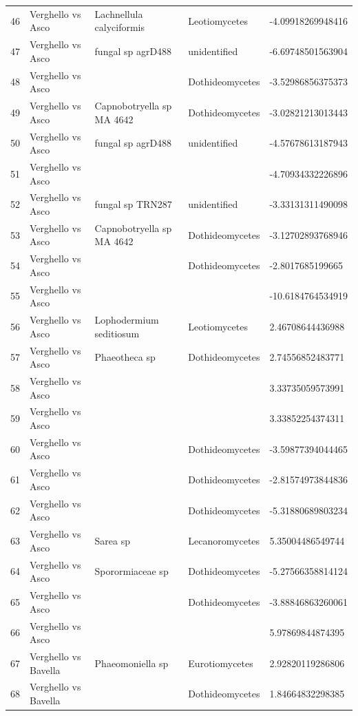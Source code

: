 \documentclass[12pt]{article}\usepackage[]{graphicx}\usepackage[]{color}
\numberwithin{figure}{section}
\begin{document}
\begin{table}[ht]
\begin{tabular}{lllll}
  46 & Verghello vs Asco & Lachnellula calyciformis & Leotiomycetes & -4.09918269948416 \\ 
  47 & Verghello vs Asco & fungal sp agrD488 & unidentified & -6.69748501563904 \\ 
  48 & Verghello vs Asco &  & Dothideomycetes & -3.52986856375373 \\ 
  49 & Verghello vs Asco & Capnobotryella sp MA 4642 & Dothideomycetes & -3.02821213013443 \\ 
  50 & Verghello vs Asco & fungal sp agrD488 & unidentified & -4.57678613187943 \\ 
  51 & Verghello vs Asco &  &  & -4.70934332226896 \\ 
  52 & Verghello vs Asco & fungal sp TRN287 & unidentified & -3.33131311490098 \\ 
  53 & Verghello vs Asco & Capnobotryella sp MA 4642 & Dothideomycetes & -3.12702893768946 \\ 
  54 & Verghello vs Asco &  & Dothideomycetes & -2.8017685199665 \\ 
  55 & Verghello vs Asco &  &  & -10.6184764534919 \\ 
  56 & Verghello vs Asco & Lophodermium seditiosum & Leotiomycetes & 2.46708644436988 \\ 
  57 & Verghello vs Asco & Phaeotheca sp & Dothideomycetes & 2.74556852483771 \\ 
  58 & Verghello vs Asco &  &  & 3.33735059573991 \\ 
  59 & Verghello vs Asco &  &  & 3.33852254374311 \\ 
  60 & Verghello vs Asco &  & Dothideomycetes & -3.59877394044465 \\ 
  61 & Verghello vs Asco &  & Dothideomycetes & -2.81574973844836 \\ 
  62 & Verghello vs Asco &  & Dothideomycetes & -5.31880689803234 \\ 
  63 & Verghello vs Asco & Sarea sp & Lecanoromycetes & 5.35004486549744 \\ 
  64 & Verghello vs Asco & Sporormiaceae sp & Dothideomycetes & -5.27566358814124 \\ 
  65 & Verghello vs Asco &  & Dothideomycetes & -3.88846863260061 \\ 
  66 & Verghello vs Asco &  &  & 5.97869844874395 \\ 
  67 & Verghello vs Bavella & Phaeomoniella sp & Eurotiomycetes & 2.92820119286806 \\ 
  68 & Verghello vs Bavella &  & Dothideomycetes & 1.84664832298385 \\ 

\end{tabular}
\end{table}
\end{document}
